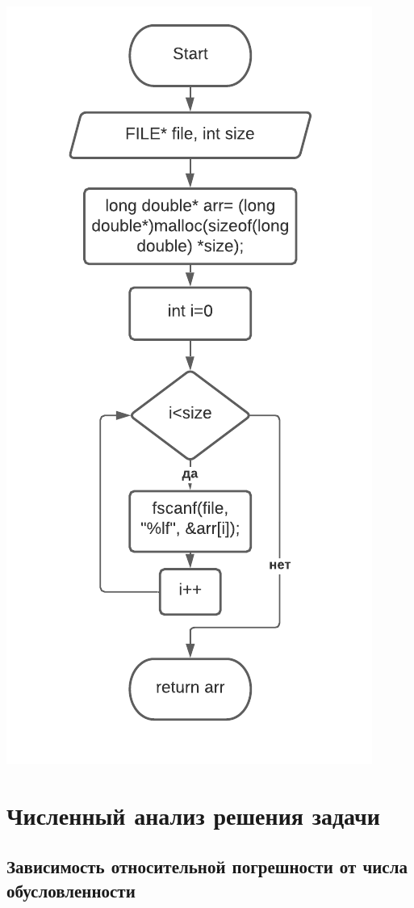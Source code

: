 \includegraphics[scale=0.5]{block2.pdf}

\section{Численный анализ решения задачи}

\subsection{Зависимость относительной погрешности от числа обусловленности}

